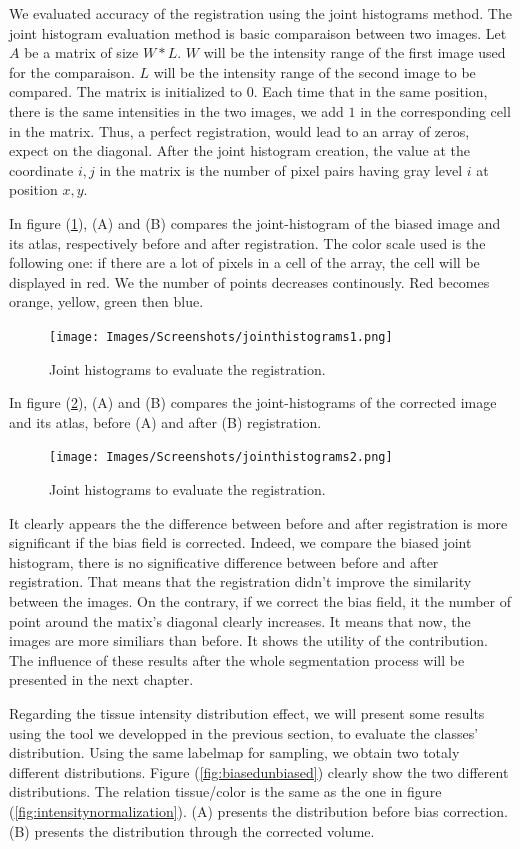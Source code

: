 We evaluated accuracy of the registration using the joint histograms method.
The joint histogram evaluation method is basic comparaison between two images. Let $A$ be a matrix of size $W*L$. $W$ will be the intensity range of the first image used for the comparaison. $L$ will be the intensity range of the second image to be compared. The matrix is initialized to $0$. Each time that in the same position, there is the same intensities in the two images, we add $1$ in the corresponding cell in the matrix. Thus, a perfect registration, would lead to an array of zeros, expect on the diagonal.
After the joint histogram creation, the value at the coordinate ${i,j}$ in the matrix is the number of pixel pairs having gray level $i$ at position ${x,y}$.
\par
In figure (\ref{fig:joint1}), (A) and (B) compares the joint-histogram of the biased image and its atlas, respectively before and after registration.  The color scale used is the following one: if there are a lot of pixels in a cell of the array, the cell will be displayed in red. We the number of points decreases continously. Red becomes orange, yellow, green then blue.

\begin{figure}\centering
  \texttt{[image: Images/Screenshots/jointhistograms1.png]}
  \caption{Joint histograms to evaluate the registration.}\label{fig:joint1}
\end{figure}


In figure (\ref{fig:joint2}), (A) and (B) compares the joint-histograms of the corrected image and its atlas, before (A) and after (B) registration.

\begin{figure}\centering
  \texttt{[image: Images/Screenshots/jointhistograms2.png]}
  \caption{Joint histograms to evaluate the registration.}\label{fig:joint2}
\end{figure}

It clearly appears the the difference between before and after registration is more significant if the bias field is corrected. Indeed, we compare the biased joint histogram, there is no significative difference between before and after registration. That means that the registration didn't improve the similarity between the images. On the contrary, if we correct the bias field, it the number of point around the matix's diagonal clearly increases. It means that now, the images are more similiars than before. It shows the utility of the contribution. The influence of these results after the whole segmentation process will be presented in the next chapter.
\par
Regarding the tissue intensity distribution effect, we will present some results using the tool we developped in the previous section, to evaluate the classes' distribution.
Using the same labelmap for sampling, we obtain two totaly different distributions. Figure (\ref{fig:biasedunbiased}) clearly show the two different distributions. The relation tissue/color is the same as the one in figure (\ref{fig:intensitynormalization}). (A) presents the distribution before bias correction. (B) presents the distribution through the corrected volume.

